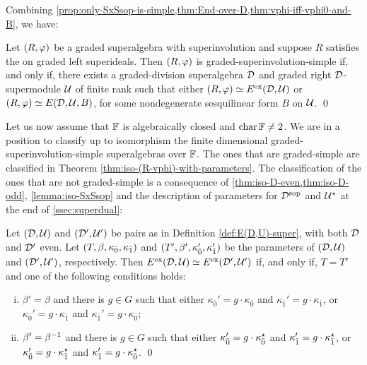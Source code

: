 Combining \cref{prop:only-SxSsop-is-simple,thm:End-over-D,thm:vphi-iff-vphi0-and-B}, we have:

\begin{cor}\label{cor:SxSsop-with-dcc}
    Let $(R, \varphi)$ be a graded superalgebra with superinvolution and suppose $R$ satisfies the \dcc on graded left superideals. 
    Then $(R, \varphi)$ is graded-superinvolution-simple if, and only if, there exists a graded-division superalgebra $\mathcal{D}$ and graded right $\mathcal{D}$-supermodule $\mathcal U$ of finite rank such that either
    $(R, \varphi) \simeq E^{\mathrm{ex}} (\mathcal{D}, \mathcal U)$ or $(R, \varphi) \simeq E(\mathcal{D}, \mathcal U, B)$, for some nondegenerate sesquilinear form $B$ on $\mathcal U$. \qed
\end{cor}

Let us now assume that $\mathbb{F}$ is algebraically closed and $\operatorname{char} \mathbb{F} \neq 2$. 
We are in a position to classify up to isomorphism the finite dimensional graded-superinvolution-simple  superalgebras over $\mathbb{F}$. 
The ones that are graded-simple are classified in Theorem \ref{thm:iso-(R-vphi)-with-parameters}. 
The classification of the ones that are not graded-simple is a consequence of \cref{thm:iso-D-even,thm:iso-D-odd}, \cref{lemma:iso-SxSsop} and the description of parameters for $\mathcal{D}^{\mathrm{sop}}$ and $\mathcal U^\star$ at the end of \cref{ssec:superdual}:

\begin{thm}\label{thm:iso-D-even-ExEsop}
	Let $(\mathcal{D}, \mathcal U)$ and $(\mathcal{D}', \mathcal U')$ be pairs as in Definition \ref{def:E(D,U)-super}, with both $\mathcal{D}$ and $\mathcal{D}'$ even. 
	Let $(T, \beta, \kappa_{\bar{0}}, \kappa_{\bar{1}})$ and $(T', \beta', \kappa_{\bar{0}}', \kappa_{\bar{1}}')$ be the parameters of $(\mathcal{D}, \mathcal U)$ and $(\mathcal{D}', \mathcal U')$, respectively. 
	Then $E^{\mathrm{ex}}(\mathcal{D}, \mathcal U) \simeq E^{\mathrm{ex}}(\mathcal{D}', \mathcal U')$ if, and only if, $T=T'$ and one of the following conditions holds:
	\begin{enumerate}[(i)]
	    \item $\beta'=\beta$ and there is $g\in G$ such that either $\kappa_{\bar 0}'=g \cdot \kappa_{\bar 0}$ and $\kappa_{\bar 1}'=g \cdot \kappa_{\bar 1}$, or $\kappa_{\bar 0}'=g \cdot \kappa_{\bar 1}$ and $\kappa_{\bar 1}'=g \cdot \kappa_{\bar 0}$;
	    \item $\beta'=\beta^{-1}$ and there is $g\in G$ such that either $\kappa_{\bar 0}'=g \cdot \kappa_{\bar 0}^\star$ and $\kappa_{\bar 1}'=g \cdot \kappa_{\bar 1}^\star$, or $\kappa_{\bar 0}'=g \cdot \kappa_{\bar 1}^\star$ and $\kappa_{\bar 1}'=g \cdot \kappa_{\bar 0}^\star$. \qed
	\end{enumerate}
\end{thm}

